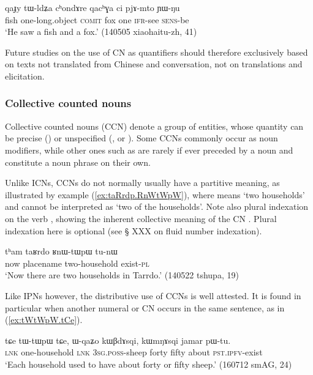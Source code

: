 \begin{exe}
\ex \label{ex:qaJY.tWldZa}
\gll qaɟy tɯ-ldʑa cʰondɤre qacʰɣa ci pjɤ-mto ɲɯ-ŋu \\
fish one-long.object \textsc{comit} fox one \textsc{ifr}-see \textsc{sens}-be \\
\glt `He saw a fish and a fox.' (140505 xiaohaitu-zh, 41)
\end{exe} 

Future studies on the use of CN as quantifiers should therefore exclusively based on texts not translated from Chinese and conversation, not on translations and elicitation.

\subsubsection{Collective counted nouns} \label{sec:CCN}
Collective counted nouns (CCN) denote a group of entities, whose quantity can be precise () or unspecified (,  or ). Some CCNs commonly occur as noun modifiers, while other ones such as  are rarely if ever preceded by a noun and constitute a noun phrase on their own.

Unlike ICNs, CCNs do not normally usually have a partitive meaning, as illustrated by example (\ref{ex:taRrdp.RnWtWpW}), where  means `two households' and cannot be interpreted as `two of the households'. Note also plural indexation on the verb , showing the inherent collective meaning of the CN . Plural indexation here is optional (see § XXX on fluid number indexation).

\begin{exe}
\ex \label{ex:taRrdp.RnWtWpW}
\gll tʰam taʁrdo ʁnɯ-tɯpɯ tu-nɯ \\
now placename two-household exist-\textsc{pl} \\
\glt `Now there are two households in Tarrdo.' (140522 tshupa, 19)
\end{exe} 

Like IPNs however, the distributive use of CCNs is well attested. It is found in particular when another numeral or CN occurs in the same sentence, as in (\ref{ex:tWtWpW.tCe}).

\begin{exe}
\ex \label{ex:tWtWpW.tCe}
\gll tɕe tɯ-tɯpɯ tɕe, ɯ-qaʑo kɯβdɤsqi, kɯmŋɤsqi jamar pɯ-tu. \\
\textsc{lnk} one-household \textsc{lnk} \textsc{3sg}.\textsc{poss}-sheep forty fifty about \textsc{pst}.\textsc{ipfv}-exist \\
\glt `Each household used to have about forty or fifty sheep.' (160712 smAG, 24)
\end{exe} 

